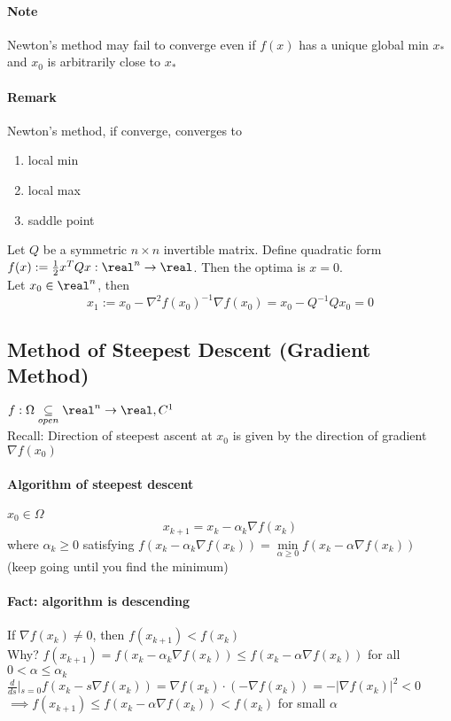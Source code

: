 \documentclass[11pt]{article}
\begin{document}
\paragraph{Note}
Newton's method may fail to converge even if $f(x)$ has a unique global min $x_*$ and $x_0$ is arbitrarily close to $x_*$
\paragraph{Remark}
Newton's method, if converge, converges to
\begin{enumerate}
	\item local min
	\item local max
	\item saddle point
\end{enumerate}

Let $Q$ be a symmetric $n \times n$ invertible matrix.
Define quadratic form $f(x) := \frac{1}{2}x^TQx: \real^n \rightarrow \real$. Then the optima is $x = 0$. \\
Let $x_0 \in \real^n$, then $$x_1 := x_0 - \nabla^2 f(x_0)^{-1} \nabla f(x_0) = x_0 - Q^{-1}Qx_0 = 0$$

\subsection{Method of Steepest Descent (Gradient Method)}
$f: \Omega \underset{open}{\subseteq} \real^n \rightarrow \real,C^1$ \\
Recall: Direction of steepest ascent at $x_0$ is given by the direction of gradient $\nabla f(x_0)$
\paragraph{Algorithm of steepest descent}
$x_0 \in \Omega$ \\
$$x_{k+1} = x_k - \alpha_k \nabla f(x_k)$$
where $\alpha_k \geq 0$ satisfying $f(x_k - \alpha_k \nabla f(x_k)) = \underset{\alpha \geq 0}{\min} f(x_k - \alpha \nabla f(x_k))$ \\
(keep going until you find the minimum) \\
\paragraph{Fact: algorithm is descending}
If $\nabla f(x_k) \neq 0$, then $f(x_{k+1}) < f(x_k)$\\
Why? $f(x_{k+1}) = f(x_k - \alpha_k \nabla f(x_k)) \leq f(x_k - \alpha \nabla f(x_k))$ for all 
$ 0 < \alpha \leq \alpha_k$ \\
 $\frac{d}{ds}|_{s=0} f(x_k - s\nabla f(x_k)) = \nabla f(x_k) \cdot (-\nabla f(x_k)) = - |\nabla f(x_k)|^2 < 0$ \\
$\implies f(x_{k+1}) \leq f(x_k - \alpha \nabla f(x_k)) < f(x_k)$ for small $\alpha$
\end{document}
